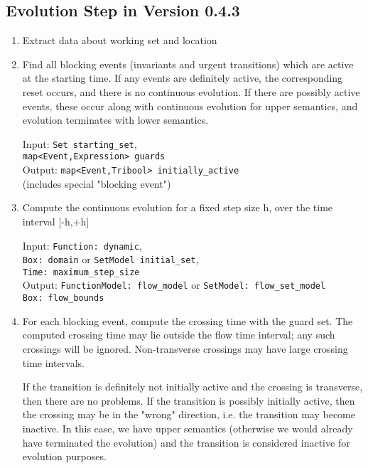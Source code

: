 \documentclass[english,a4paper]{article}
\theoremstyle{theorem}
\theoremstyle{definition}
\theoremstyle{remark}
\begin{document}
\subsection*{Evolution Step in Version 0.4.3}

\begin{enumerate}
\item Extract data about working set and location

\item Find all blocking events (invariants and urgent transitions) which are
active at the starting time. If any events are definitely active,
the corresponding reset occurs, and there is no continuous evolution.
If there are possibly active events, these occur along with continuous
evolution for upper semantics, and evolution terminates with lower
semantics.

\begin{tabbing}
Input: \= \texttt{Set starting\_set},\\
       \> \texttt{map<Event,Expression> guards}\\
Output: \= \texttt{map<Event,Tribool> initially\_active}\\
     \> \qquad (includes special "blocking event")
\end{tabbing}

\item Compute the continuous evolution for a fixed step size h, over the
time interval [-h,+h]

\begin{tabbing}
Input: \=\texttt{Function:\ dynamic},\\
       \>\texttt{Box:\ domain} or  \texttt{SetModel\ initial\_set},\\
       \>\texttt{Time:\ maximum\_step\_size}\\
Output: \=
        \texttt{FunctionModel:\ flow\_model}
           or \texttt{SetModel:\ flow\_set\_model}\\
        \> \texttt{Box:\ flow\_bounds}\\
\end{tabbing}


\item For each blocking event, compute the crossing time with the guard set.
The computed crossing time may lie outside the flow time interval;
any such crossings will be ignored. Non-transverse crossings may have
large crossing time intervals.

If the transition is definitely not initially active and the crossing
is transverse, then there are no problems. If the transition is
possibly initially active, then the crossing may be in the "wrong"
direction, i.e. the transition may become inactive. In this case, we
have upper semantics (otherwise we would already have terminated the
evolution) and the transition is considered inactive for evolution
purposes.


\end{enumerate}
\end{document}
